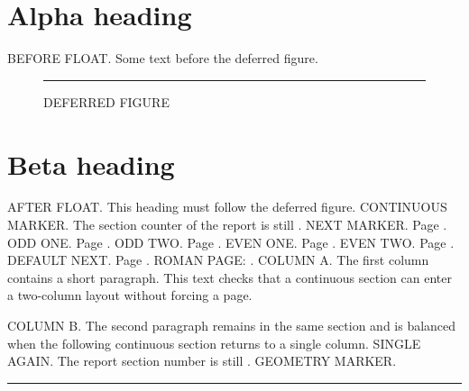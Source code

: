 \documentclass[stage=proposal,campus=shenzhen,degree-level=master,lang=en,fontset=fandol]{hithesis}
\begin{document}
\section{Alpha heading}
BEFORE FLOAT. Some text before the deferred figure.
\begin{figure}[p]
\centering\rule{80mm}{35mm}
\caption{DEFERRED FIGURE}
\end{figure}
\section{Beta heading}
AFTER FLOAT. This heading must follow the deferred figure.
\sectionbreak[continuous]
CONTINUOUS MARKER. The section counter of the report is still \thesection.
\sectionbreak[next]
NEXT MARKER. Page \thepage.
\sectionbreak[odd]
ODD ONE. Page \thepage.
\sectionbreak[odd]
ODD TWO. Page \thepage.
\sectionbreak[even]
EVEN ONE. Page \thepage.
\sectionbreak[even]
EVEN TWO. Page \thepage.
\sectionbreak
DEFAULT NEXT. Page \thepage.
\sectionbreak[next,page-number-format={number-format=lower-roman,start-at=1}]
ROMAN PAGE: \thepage.
\sectionbreak[continuous,columns={number-of-columns=2,spacing=8mm,line-between=true}]
\noindent COLUMN A. The first column contains a short paragraph. This text checks
that a continuous section can enter a two-column layout without forcing a page.
\par\noindent COLUMN B. The second paragraph remains in the same section and is
balanced when the following continuous section returns to a single column.
\sectionbreak[continuous,columns={number-of-columns=1}]
SINGLE AGAIN. The report section number is still \thesection.
\sectionbreak[next,page-setup={paper={width=210mm,height=297mm},
  margins={left=4cm,right=4cm,top=4cm,bottom=3cm},
  layout={from-edge={header=2cm,footer=2cm}}}]
GEOMETRY MARKER.\par
\noindent\rule{\textwidth}{1bp}
\end{document}
